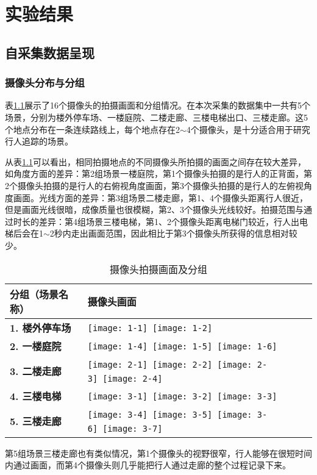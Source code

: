 \chapter{实验结果}\label{sec:experiment}

\section{自采集数据呈现}

\subsection{摄像头分布与分组}

表\ref{tab:cameraslayout}展示了16个摄像头的拍摄画面和分组情况。在本次采集的数据集中一共有5个场景，分别为楼外停车场、一楼庭院、二楼走廊、三楼电梯出口、三楼走廊。这5个地点分布在一条连续路线上，每个地点存在2$\sim$4个摄像头，是十分适合用于研究行人追踪的场景。

从表\ref{tab:cameraslayout}可以看出，相同拍摄地点的不同摄像头所拍摄的画面之间存在较大差异，如角度方面的差异：第2组场景一楼庭院，第1个摄像头拍摄的是行人的正背面，第2个摄像头拍摄的是行人的右俯视角度画面，第3个摄像头拍摄的是行人的左俯视角度画面。光线方面的差异：第3组场景二楼走廊，第1、4个摄像头距离行人很近，但是画面光线很暗，成像质量也很模糊，第2、3个摄像头光线较好。拍摄范围与通过时长的差异：第4组场景三楼电梯，第1、2个摄像头距离电梯门较近，行人出电梯后会在1$\sim$2秒内走出画面范围，因此相比于第3个摄像头所获得的信息相对较少。
\begin{table}[ht]
\centering
\caption{摄像头拍摄画面及分组}
\label{tab:cameraslayout}
\renewcommand{\arraystretch}{1.5}%
\begin{tabularx}{\textwidth}{>{\centering\bfseries}m{} >{\centering\arraybackslash}m{}}
\toprule
分组（场景名称） & \textbf{摄像头画面} \\
\midrule
1. 楼外停车场 & \texttt{[image: 1-1]}~\texttt{[image: 1-2]} \\
2. 一楼庭院 & \texttt{[image: 1-4]}~\texttt{[image: 1-5]}~\texttt{[image: 1-6]} \\
3. 二楼走廊 & \texttt{[image: 2-1]}~\texttt{[image: 2-2]}~\texttt{[image: 2-3]}~\texttt{[image: 2-4]} \\
4. 三楼电梯 & \texttt{[image: 3-1]}~\texttt{[image: 3-2]}~\texttt{[image: 3-3]} \\
5. 三楼走廊 & \texttt{[image: 3-4]}~\texttt{[image: 3-5]}~\texttt{[image: 3-6]}~\texttt{[image: 3-7]} \\
\bottomrule
\end{tabularx}
\end{table}
第5组场景三楼走廊也有类似情况，第1个摄像头的视野很窄，行人能够在很短时间内通过画面，而第4个摄像头则几乎能把行人通过走廊的整个过程记录下来。

